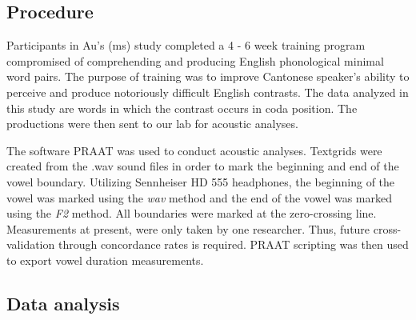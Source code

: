 \documentclass[man]{apa6}
\theoremstyle{definition}
\theoremstyle{definition}
\theoremstyle{definition}
\theoremstyle{remark}
\begin{document}
\subsection{Procedure}\label{procedure}

Participants in Au's (ms) study completed a 4 - 6 week training program
compromised of comprehending and producing English phonological minimal
word pairs. The purpose of training was to improve Cantonese speaker's
ability to perceive and produce notoriously difficult English contrasts.
The data analyzed in this study are words in which the contrast occurs
in coda position. The productions were then sent to our lab for acoustic
analyses.

The software PRAAT was used to conduct acoustic analyses. Textgrids were
created from the .wav sound files in order to mark the beginning and end
of the vowel boundary. Utilizing Sennheiser HD 555 headphones, the
beginning of the vowel was marked using the \emph{wav} method and the
end of the vowel was marked using the \emph{F2} method. All boundaries
were marked at the zero-crossing line. Measurements at present, were
only taken by one researcher. Thus, future cross-validation through
concordance rates is required. PRAAT scripting was then used to export
vowel duration measurements.

\subsection{Data analysis}\label{data-analysis}
\end{document}
